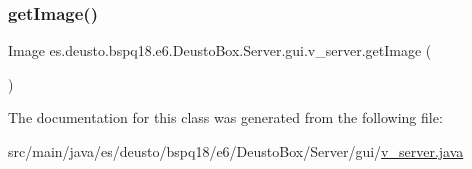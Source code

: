 \subsubsection{\texorpdfstring{get\+Image()}{getImage()}}
{\footnotesize\ttfamily Image es.\+deusto.\+bspq18.\+e6.\+Deusto\+Box.\+Server.\+gui.\+v\+\_\+server.\+get\+Image (\begin{DoxyParamCaption}{ }\end{DoxyParamCaption})}



The documentation for this class was generated from the following file\+:\begin{DoxyCompactItemize}
\item 
src/main/java/es/deusto/bspq18/e6/\+Deusto\+Box/\+Server/gui/\mbox{\hyperlink{v__server_8java}{v\+\_\+server.\+java}}\end{DoxyCompactItemize}
